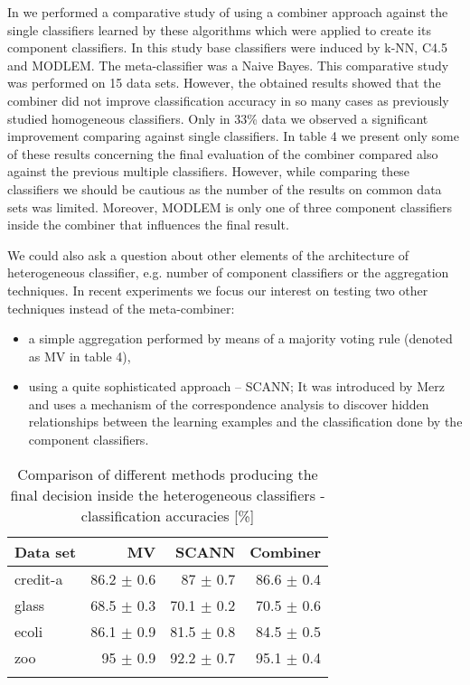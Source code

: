 \documentclass{llncs}
\begin{document}
 In \cite{nowaczyk} we performed a comparative study of using a combiner
 approach against the single classifiers learned by these algorithms which
 were applied to create its component classifiers. In this study base
 classifiers were induced by k-NN, C4.5 and MODLEM. The meta-classifier was
 a Naive Bayes. This comparative study was performed on 15 data sets.
 However, the obtained results showed that the  combiner did not improve
 classification accuracy in so many cases as previously studied
 homogeneous classifiers.
 Only in 33\% data we observed a significant improvement comparing against
 single classifiers. In table 4 we present only some of these results concerning
 the final evaluation of the
 combiner compared also against the previous multiple classifiers. However,
while comparing these classifiers we should be cautious as the number of the
results on common data sets was limited. Moreover, MODLEM is only one of
three component classifiers inside the combiner that influences the final
result.


We could also ask a question about other elements of the architecture of
heterogeneous classifier, e.g. number of component classifiers or the
aggregation techniques. In recent experiments we focus our interest on
testing two other techniques instead of the meta-combiner:
\begin{itemize}
\item a simple aggregation performed by means of a majority voting rule (denoted as
MV in table 4),
\item using a quite sophisticated approach -- SCANN; It was introduced by
Merz \cite{Merz} and uses a mechanism of the correspondence analysis to
discover hidden relationships between the learning examples and the
classification done by the component classifiers.
\end{itemize}



\begin{table}
\centering \caption{Comparison of different methods producing the final
decision inside the heterogeneous classifiers - classification accuracies
[\%]}
\begin{tabular}{lrrr}
\hline\noalign{\smallskip} Data set  & MV &\quad SCANN & Combiner
\\
\hline\noalign{\smallskip}
 credit-a & 86.2 \scriptsize{$\pm$ 0.6} & 87 \scriptsize{$\pm$ 0.7}
& 86.6 \scriptsize{$\pm$ 0.4} \\ glass & 68.5 \scriptsize{$\pm$ 0.3} & 70.1
\scriptsize{$\pm$ 0.2} & 70.5 \scriptsize{$\pm$ 0.6}
 \\
ecoli & 86.1 \scriptsize{$\pm$ 0.9} & 81.5 \scriptsize{$\pm$ 0.8} & 84.5
\scriptsize{$\pm$ 0.5} \\ zoo & 95  \scriptsize{$\pm$ 0.9} & 92.2
\scriptsize{$\pm$ 0.7} & 95.1 \scriptsize{$\pm$ 0.4} \\\noalign{\smallskip}
 \hline
\end{tabular}
\end{table}
\end{document}
